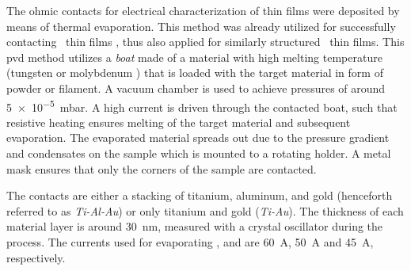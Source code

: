 The ohmic contacts for electrical characterization of  thin films were deposited by means of thermal evaporation.
This method was already utilized for successfully contacting \agao\ thin films
    \cite{vogt2023},
thus also applied for similarly structured \cro\ thin films.
This \gls{pvd} method utilizes a \emph{boat} made of a material with high melting temperature (tungsten  or molybdenum ) that is loaded with the target material in form of powder or filament.
A vacuum chamber is used to achieve pressures of around \qty{5e-5}{\milli\bar}.
A high current is driven through the contacted boat, such that resistive heating ensures melting of the target material and subsequent evaporation.
The evaporated material spreads out due to the pressure gradient and condensates on the sample which is mounted to a rotating holder.
A metal mask ensures that only the corners of the sample are contacted.

The contacts are either a stacking of titanium, aluminum, and gold (henceforth referred to as \emph{Ti-Al-Au}) or only titanium and gold (\emph{Ti-Au}).
The thickness of each material layer is around \qty{30}{\nm}, measured with a crystal oscillator during the process.
The currents used for evaporating ,  and  are \qty{60}{\ampere}, \qty{50}{\ampere} and \qty{45}{\ampere}, respectively.